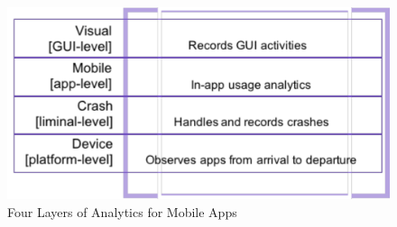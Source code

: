 

\begin{figure}
    \includegraphics[width=\linewidth]{images/4-layers-of-analytics.pdf}
    \caption{Four Layers of Analytics for Mobile Apps}
    \label{fig:four-layers-of-analytics-for-mobile-apps}
\end{figure}

